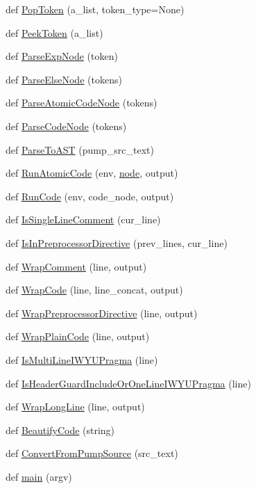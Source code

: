 \begin{DoxyCompactItemize}
def \hyperlink{namespacepump_a45e1d5d5c1c188fc53eee8bd1e00e6b0}{Pop\+Token} (a\+\_\+list, token\+\_\+type=None)
\item 
def \hyperlink{namespacepump_ab12085e099ab4bd0cd968efdc435ec31}{Peek\+Token} (a\+\_\+list)
\item 
def \hyperlink{namespacepump_af62b08489d90e69d0577e82c98383ba7}{Parse\+Exp\+Node} (token)
\item 
def \hyperlink{namespacepump_ae40493525a993e81929c6905e329a406}{Parse\+Else\+Node} (tokens)
\item 
def \hyperlink{namespacepump_a5532710f334f026f80fc485decf5078e}{Parse\+Atomic\+Code\+Node} (tokens)
\item 
def \hyperlink{namespacepump_aabbc064b8664abbe05618b3a0f5a6c38}{Parse\+Code\+Node} (tokens)
\item 
def \hyperlink{namespacepump_a56ac10a83a3a875d305c9aae71fc0549}{Parse\+To\+A\+ST} (pump\+\_\+src\+\_\+text)
\item 
def \hyperlink{namespacepump_a901e6abd34691a0d779178a615cc09c1}{Run\+Atomic\+Code} (env, \hyperlink{classnode}{node}, output)
\item 
def \hyperlink{namespacepump_ac6a714a44e28c2a19a1dfabeb9c9d4f1}{Run\+Code} (env, code\+\_\+node, output)
\item 
def \hyperlink{namespacepump_a417078b1d036b67756c47e5dc50324dc}{Is\+Single\+Line\+Comment} (cur\+\_\+line)
\item 
def \hyperlink{namespacepump_aa33101b01d5781710262f3b5dadd8bc8}{Is\+In\+Preprocessor\+Directive} (prev\+\_\+lines, cur\+\_\+line)
\item 
def \hyperlink{namespacepump_a73951c98652038351b1cd24291433e12}{Wrap\+Comment} (line, output)
\item 
def \hyperlink{namespacepump_a42502545a37fcd4513a0a7ac8ef3c0eb}{Wrap\+Code} (line, line\+\_\+concat, output)
\item 
def \hyperlink{namespacepump_a59e8ae06bae068d2d72df4f0340635d8}{Wrap\+Preprocessor\+Directive} (line, output)
\item 
def \hyperlink{namespacepump_a60723738cc38d8ced7e2cfecc72d8b11}{Wrap\+Plain\+Code} (line, output)
\item 
def \hyperlink{namespacepump_a707a3ff4514c89607e48a87589aed787}{Is\+Multi\+Line\+I\+W\+Y\+U\+Pragma} (line)
\item 
def \hyperlink{namespacepump_ac8a553b60dc83d100361a0e98d98451b}{Is\+Header\+Guard\+Include\+Or\+One\+Line\+I\+W\+Y\+U\+Pragma} (line)
\item 
def \hyperlink{namespacepump_a02427e2ddc80f0f408e27dfc3e38e702}{Wrap\+Long\+Line} (line, output)
\item 
def \hyperlink{namespacepump_a3456db8d85605892d670669c4e238cd7}{Beautify\+Code} (string)
\item 
def \hyperlink{namespacepump_a568fe53d1443489ac15bac4a0f9faf91}{Convert\+From\+Pump\+Source} (src\+\_\+text)
\item 
def \hyperlink{namespacepump_abcf26971f7bdbad77c2c168c110312df}{main} (argv)
\end{DoxyCompactItemize}
